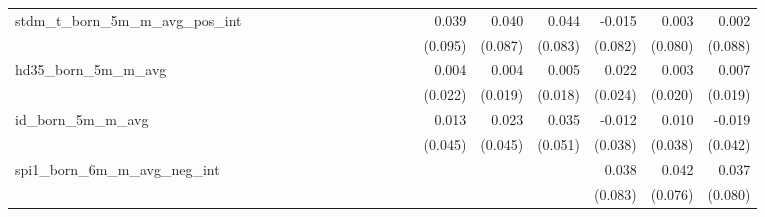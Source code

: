 \begin{tabular}{lrrrrrrrrrrrrrrrrrr}
stdm\_t\_born\_5m\_m\_avg\_pos\_int         &             &             &             &             &             &             &             &             &             &             &             &             &       0.039 &       0.040 &       0.044 &      -0.015 &       0.003 &       0.002 \\ 
                                            &             &             &             &             &             &             &             &             &             &             &             &             &     (0.095) &     (0.087) &     (0.083) &     (0.082) &     (0.080) &     (0.088) \\ 
hd35\_born\_5m\_m\_avg                      &             &             &             &             &             &             &             &             &             &             &             &             &       0.004 &       0.004 &       0.005 &       0.022 &       0.003 &       0.007 \\ 
                                            &             &             &             &             &             &             &             &             &             &             &             &             &     (0.022) &     (0.019) &     (0.018) &     (0.024) &     (0.020) &     (0.019) \\ 
id\_born\_5m\_m\_avg                        &             &             &             &             &             &             &             &             &             &             &             &             &       0.013 &       0.023 &       0.035 &      -0.012 &       0.010 &      -0.019 \\ 
                                            &             &             &             &             &             &             &             &             &             &             &             &             &     (0.045) &     (0.045) &     (0.051) &     (0.038) &     (0.038) &     (0.042) \\ 
spi1\_born\_6m\_m\_avg\_neg\_int            &             &             &             &             &             &             &             &             &             &             &             &             &             &             &             &       0.038 &       0.042 &       0.037 \\ 
                                            &             &             &             &             &             &             &             &             &             &             &             &             &             &             &             &     (0.083) &     (0.076) &     (0.080) \\ 

\end{tabular}
